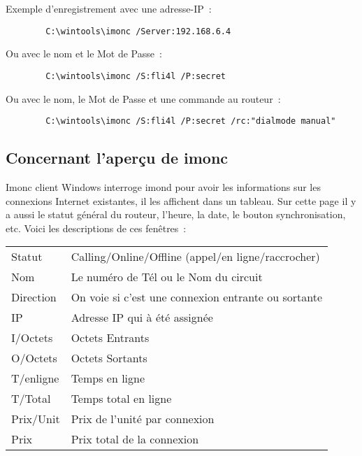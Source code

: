   Exemple d'enregistrement avec une adresse-IP~:

\begin{example}
\begin{verbatim}
        C:\wintools\imonc /Server:192.168.6.4
\end{verbatim}
\end{example}

  Ou avec le nom et le Mot de Passe~:

\begin{example}
\begin{verbatim}
        C:\wintools\imonc /S:fli4l /P:secret
\end{verbatim}
\end{example}

  Ou avec le nom, le Mot de Passe et une commande au routeur~:

\begin{example}
\begin{verbatim}
        C:\wintools\imonc /S:fli4l /P:secret /rc:"dialmode manual"
\end{verbatim}
\end{example}

  \subsection{Concernant l'aperçu de imonc}

  Imonc client Windows interroge imond pour avoir les informations sur les
  connexions Internet existantes, il les affichent dans un tableau. Sur cette
  page il y a aussi le statut général du routeur, l'heure, la date, le bouton
  synchronisation, etc. Voici les descriptions de ces fenêtres~:

  \begin{tabular}{lp{9cm}}
    Statut             &Calling/Online/Offline (appel/en ligne/raccrocher)\\
    Nom                &Le numéro de Tél ou le Nom du circuit\\
    Direction          &On voie si c'est une connexion entrante ou sortante\\
    IP                 &Adresse IP qui à été assignée\\
    I/Octets           &Octets Entrants\\
    O/Octets           &Octets Sortants\\
    T/enligne          &Temps en ligne\\
    T/Total            &Temps total en ligne\\
    Prix/Unit          &Prix de l'unité par connexion\\
    Prix               &Prix total de la connexion\\
  \end{tabular}


